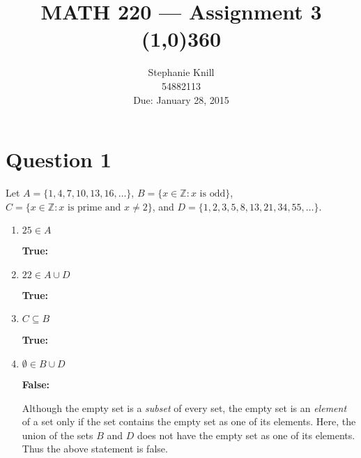 \documentclass[11pt, oneside]{article}   	%
\begin{document}
\title{MATH 220 --- Assignment 3 \\
\line(1,0){360} }             %

\author{
Stephanie Knill \\
54882113 \\
Due: January 28, 2015}

\date{}                   %
\maketitle

\thispagestyle{empty}                   %



\section*{Question 1}

Let $A = \{1,4,7,10,13,16, \ldots\}$, $B = \{x \in \mathbb{Z} : x \text{ is odd}\}$, $C = \{x \in \mathbb{Z} : x \text{ is prime and } x \neq 2\}$, and $D=\{1,2,3,5,8,13,21,34,55, \ldots \}$.

\begin{enumerate}[ (a)]           
    \item $25 \in A$
    
   \textbf{True:} 
    
    \item $22 \in A \cup D$
    
    \textbf{True:} 
    
    \item $C \subseteq B$
    
    \textbf{True:} 
    
    \item $\emptyset \in B \cup D$
    
    \textbf{False:} 
    
    Although the empty set is a \textit{subset} of every set, the empty set is an \textit{element} of a set only if the set contains the empty set as one of its elements. Here, the union of the sets $B$ and $D$ does not have the empty set as one of its elements. Thus the above statement is false.
    
\end{enumerate}
\end{document}
